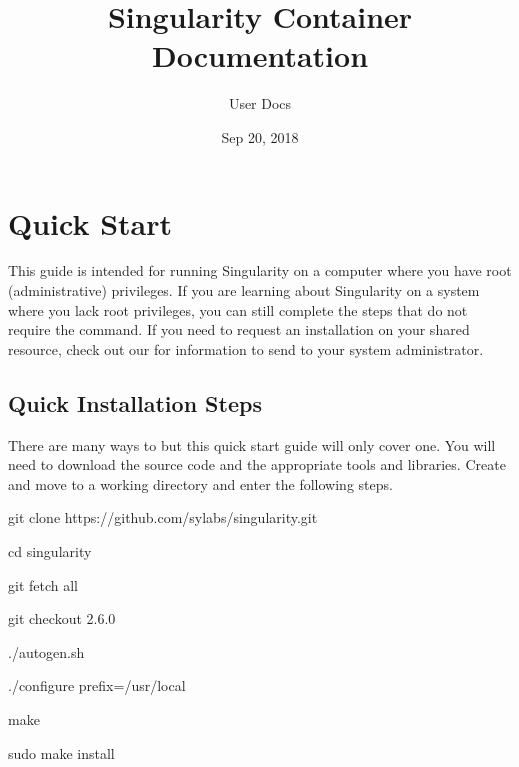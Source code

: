 \documentclass[letterpaper,10pt,english]{sphinxmanual}
\title{Singularity Container Documentation}
\date{Sep 20, 2018}
\author{User Docs}
\begin{document}
\maketitle
\sphinxtableofcontents
{}\label{\detokenize{index::doc}}



\chapter{Quick Start}
\label{\detokenize{quick_start:quick-start}}\label{\detokenize{quick_start:id1}}\label{\detokenize{quick_start::doc}}\label{\detokenize{quick_start:sec-quickstart}}
This guide is intended for running Singularity on a computer where you
have root (administrative) privileges. If you are learning about
Singularity on a system where you lack root privileges, you can still
complete the steps that do not require the  command. If you need to
request an installation on your shared resource, check out our {\hyperref[\detokenize{installation:installation-request}]{}} for information to send to your
system administrator.


\section{Quick Installation Steps}
\label{\detokenize{quick_start:quick-installation-steps}}\label{\detokenize{quick_start:quick-installation}}
There are many ways to {\hyperref[\detokenize{installation:installation}]{}} but this quick start guide will only cover one.
You will need  to download the source code and the appropriate tools and libraries. Create and move to a working directory and enter the following steps.

%
\begin{sphinxVerbatim}[commandchars=\\\{\}]
git clone https://github.com/sylabs/singularity.git

cd singularity

git fetch \PYGZhy{}\PYGZhy{}all

git checkout 2.6.0

./autogen.sh

./configure \PYGZhy{}\PYGZhy{}prefix=/usr/local

make

sudo make install
\end{sphinxVerbatim}
\end{document}

